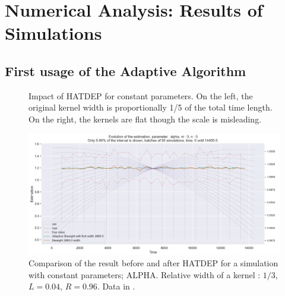 \chapter{Numerical Analysis: Results of Simulations}


\section{First usage of the Adaptive Algorithm}


\begin{figure}
\centering
{} 
\caption{Impact of HATDEP for constant parameters. On the left, the original kernel width is proportionally 1/5 of the total time length. On the right, the kernels are flat though the scale is misleading.}
\label{fig:compar_kernels_0}
\end{figure}


\begin{figure}
\centering
\includegraphics[width = 0.90 \textwidth]{../imag/chap3/0/A.png}
\caption{Comparison of the result before and after HATDEP for a simulation with constant parameters; ALPHA. Relative width of a kernel : $1/3$, $L = 0.04$, $R = 0.96$. Data in \protect {}.}
\label{fig:first_estimate_0_alpha}
\end{figure}

